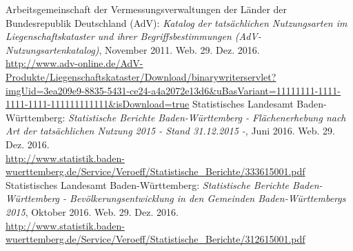 \begin{thebibliography}{50}
   Arbeitsgemeinschaft der Vermessungsverwaltungen der Länder der Bundesrepublik Deutschland (AdV): \textit{Katalog der tatsächlichen Nutzungsarten im Liegenschaftskataster und ihrer Begriffsbestimmungen (AdV-Nutzungsartenkatalog)}, November 2011. Web. 29. Dez. 2016.\\ \url{http://www.adv-online.de/AdV-Produkte/Liegenschaftskataster/Download/binarywriterservlet?imgUid=3ea209e9-8835-5431-ce24-a4a2072e13d6&uBasVariant=11111111-1111-1111-1111-111111111111&isDownload=true}
   Statistisches Landesamt Baden-Württemberg: \textit{Statistische Berichte Baden-Württemberg - Flächenerhebung nach Art der tatsächlichen Nutzung 2015 - Stand 31.12.2015 -}, Juni 2016. Web. 29. Dez. 2016. \\ \url{http://www.statistik.baden-wuerttemberg.de/Service/Veroeff/Statistische_Berichte/333615001.pdf} 
   Statistisches Landesamt Baden-Württemberg: \textit{Statistische Berichte Baden-Württemberg - Bevölkerungsentwicklung in den Gemeinden Baden-Württembergs 2015}, Oktober 2016. Web. 29. Dez. 2016. \\ \url{http://www.statistik.baden-wuerttemberg.de/Service/Veroeff/Statistische_Berichte/312615001.pdf} 
\end{thebibliography}
